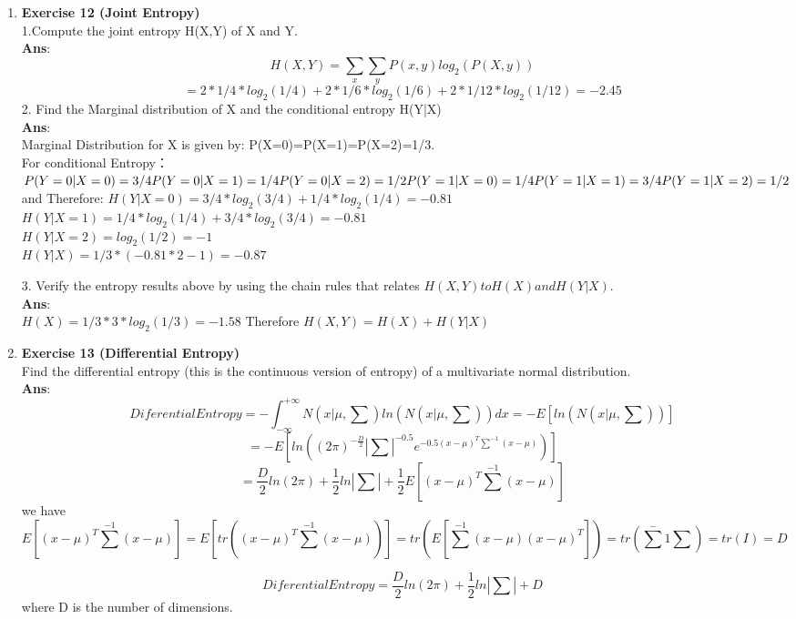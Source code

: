 \documentclass{article}
\begin{document}
\begin{enumerate}
\item \textbf{Exercise 12 (Joint Entropy)} \\
1.Compute the joint entropy H(X,Y) of X and Y. \\ 
\textbf{Ans}: \\
$$
H(X,Y)=\sum_x\sum_y P(x,y) log_2(P(X,y))$$$$
=2*1/4*log_2(1/4)+2*1/6*log_2(1/6)+2*1/12*log_2(1/12)=-2.45
$$
2. Find the Marginal distribution of X and the conditional entropy H(Y|X) \\
\textbf{Ans}: \\
Marginal Distribution for X is given by:
P(X=0)=P(X=1)=P(X=2)=1/3. \\
For conditional Entropy： 
$P(Y=0|X=0)=3/4 \\
P(Y=0|X=1)=1/4 \\
P(Y=0|X=2)=1/2 \\
P(Y=1|X=0)=1/4 \\
P(Y=1|X=1)=3/4 \\
P(Y=1|X=2)=1/2 \\ $
and Therefore: 
$H(Y|X=0)= 3/4*log_2(3/4)+1/4*log_2(1/4)=-0.81$ \\
$H(Y|X=1)= 1/4*log_2(1/4)+3/4*log_2(3/4)=-0.81$ \\
$H(Y|X=2)= log_2(1/2)=-1$ \\
$H(Y|X)=1/3*(-0.81*2-1)=-0.87$

3. Verify the entropy results above by using the chain rules that relates $H(X, Y ) to H(X) and H(Y |X)$.  \\
\textbf{Ans}: \\
$H(X)=1/3*3*log_2(1/3)=-1.58$ Therefore $H(X,Y)=H(X)+H(Y|X)$ \\

\item \textbf{Exercise 13 (Differential Entropy)} \\ 
Find the differential entropy (this is the continuous version of entropy) of a multivariate normal distribution. \\ 
\textbf{Ans}: \\
$$
Diferential Entropy=- \int _{-\infty}^{+\infty} N(x|\mu,\sum)ln(N(x|\mu,\sum))dx
=-E[ln(N(x|\mu,\sum))]
$$
$$
=-E[ln((2\pi)^{-\frac{D}{2}}|\sum|^{-0.5}e^{-0.5(x-\mu)^T\sum^{-1}(x-\mu)})]
$$
$$
=\frac{D}{2}ln(2\pi)+\frac{1}{2}ln|\sum|+\frac{1}{2}E[(x-\mu)^T\sum^{-1}(x-\mu)]
$$
we have
$$
E[(x-\mu)^T\sum^{-1}(x-\mu)]= E[tr((x-\mu)^T\sum^{-1}(x-\mu))]=tr(E[\sum^{-1}(x-\mu)(x-\mu)^T])=tr(\sum^-1\sum)=tr(I)=D
$$

$$
Diferential Entropy=\frac{D}{2}ln(2\pi)+\frac{1}{2}ln|\sum|+D 
$$
where D is the number of dimensions.




\end{enumerate}
\end{document}
